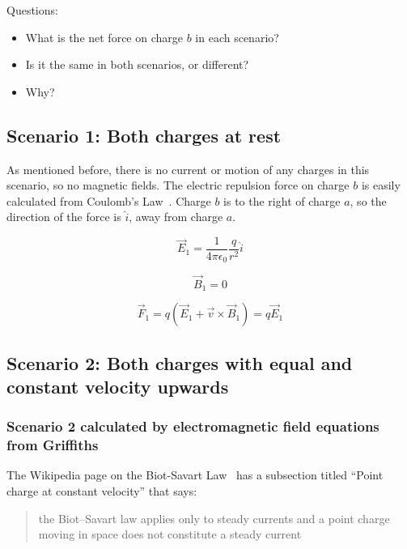 \documentclass[a4paper]{article}
\theoremstyle{plain}
\theoremstyle{definition}
\newcommand{\vect}[1]{\vec{#1}}
\newcommand{\hatvec}[1]{\hat{#1}}
\newcommand{\ihat}{\hatvec{i}}
\begin{document}
Questions:
\begin{itemize}
  \item What is the net force on charge $b$ in each scenario?
  \item Is it the same in both scenarios, or different?
  \item Why?
\end{itemize}


\subsection{Scenario 1: Both charges at rest}

As mentioned before, there is no current or motion of any charges in
this scenario, so no magnetic fields.  The electric repulsion force on
charge $b$ is easily calculated from Coulomb's Law~\cite{CoulombsLaw}.
Charge $b$ is to the right of charge $a$, so the direction of the force is
$\ihat$, away from charge $a$.

\begin{equation}
\vect{E}_1 = \frac{1}{4 \pi \epsilon_0} \frac{q}{r^2} \ihat \label{eq:E1}
\end{equation}

\begin{equation}
\vect{B}_1 = 0
\end{equation}

\begin{equation}
\vect{F}_1 = q(\vect{E}_1 + \vect{v} \times \vect{B}_1)
           = q \vect{E}_1   \label{eq:F1}
\end{equation}


\subsection{Scenario 2: Both charges with equal and constant velocity upwards}

\subsubsection{Scenario 2 calculated by electromagnetic field equations from Griffiths}

The Wikipedia page on the Biot-Savart
Law~\cite{EMFieldFromPointCharge} has a subsection titled ``Point
charge at constant velocity'' that says:

\begin{quote}
the Biot–Savart law applies only to steady currents and a point charge
moving in space does not constitute a steady current
\end{quote}
\end{document}
